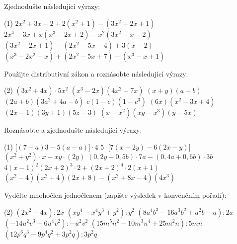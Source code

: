 \documentclass[12pt,a4paper]{article}
\begin{document}
\begin{exercise}
    Zjednodušte následující výrazy:
    \begin{tasks}(1)
        \task $2x^2 + 3x - 2 + 2(x^2 + 1) - (3x^2 - 2x + 1)$
        \task $2x^4 - 3x + x(x^3 - 2x + 2) - x^2(3x^2 - x - 2)$
        \task $(3x^2 - 2x + 1) - (2x^2 - 5x - 4) + 3(x-2)$
        \task $(x^3 - 2x^2 + x) + (2x^2 - 5x + 7) - (x^3 - x + 1)$
    \end{tasks}
\end{exercise}


\begin{exercise}
    Použijte distributivní zákon a roznásobte následující výrazy:
    \begin{tasks}(2)
        \task $(3x^2 + 4x)\cdot 5x^2$
        \task $(x^3 - 2x)(4x^2 - 7x)$
        \task $(x+y)(a+b)$
        \task $(2a+b)(3a^2+4a-b)$
        \task $c(1-c)(1-c^3)$
        \task $(6x)(x^2 - 3x + 4)$
        \task $(2x - 1)(3y + 1)(5z - 3)$
        \task $(x - x^2)(xy - x^3)(y - 5x)$
    \end{tasks}
\end{exercise}


\begin{exercise}
    Roznásobte a zjednodušte následující výrazy:
    \begin{tasks}(1)
        \task $\bigl[(7 - a)3 - 5(a - a)\bigr]\cdot 4$
        \task $5\cdot\bigl[7(x - 2y) - 6(2x - y)\bigr]$
        \task $(x^2 + y^2)\cdot x - xy\cdot(2y)$
        \task $(0{,}2y - 0{,}5b)\cdot 7a - (0{,}4a + 0{,}6b)\cdot 3b$
        \task $4(x-1)^2 (2x + 2)^3 \cdot 2 + (2x+2)^4 \cdot 2(x+1)$
        \task $(x^2 - 4)(x^2 + 4)(2x + 8) - (x^2 + 8x - 4)(4x^3)$
    \end{tasks}
\end{exercise}


\begin{exercise}
    Vydělte mnohočlen jednočlenem (zapište výsledek v konvenčním pořadí):
    \begin{tasks}(2)
        \task $(2x^2 - 4x) : 2x$
        \task $(xy^4 - x^4y^3 + y^2) : y^2$
        \task $(8a^4b^3 - 16a^3b^2 + a^2b - a) : 2a$
        \task $(-14u^2v^3 - 6u^4v^2) : -u^2v^2$
        \task $(15m^5n^2 - 10m^3n^4 + 25m^2n) : 5mn$
        \task $(12p^6q^3 - 9p^4q^2 + 3p^2q) : 3p^2q$
    \end{tasks}
\end{exercise}
\end{document}
